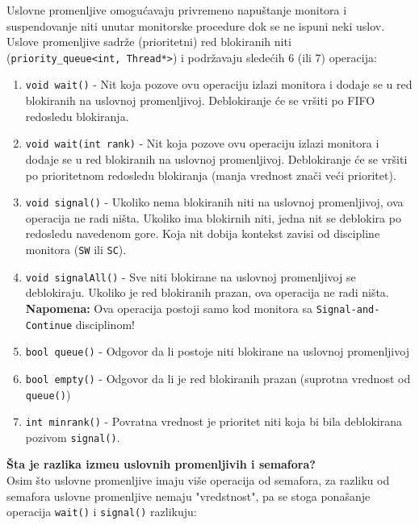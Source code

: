 Uslovne promenljive omogu\'{c}avaju privremeno napu\v{s}tanje monitora i suspendovanje niti unutar monitorske procedure dok se ne ispuni neki uslov. Uslove promenljive sadr\v{z}e (prioritetni) red blokiranih niti \\(\texttt{priority\_queue<int, Thread*>}) i podr\v{z}avaju slede\'{c}ih 6 (ili 7) operacija:
\begin{enumerate}
    \item \texttt{void wait()} - Nit koja pozove ovu operaciju izlazi monitora i dodaje se u red blokiranih na uslovnoj promenljivoj. Deblokiranje \'{c}e se vr\v{s}iti po FIFO redosledu blokiranja. 
    \item \texttt{void wait(int rank)} - Nit koja pozove ovu operaciju izlazi monitora i dodaje se u red blokiranih na uslovnoj promenljivoj. Deblokiranje \'{c}e se vr\v{s}iti po prioritetnom redosledu blokiranja (manja vrednost zna\v{c}i ve\'{c}i prioritet).
    \item \texttt{void signal()} - Ukoliko nema blokiranih niti na uslovnoj promenljivoj, ova operacija ne radi ni\v{s}ta. Ukoliko ima blokirnih niti, jedna nit se deblokira po redosledu navedenom gore. Koja nit dobija kontekst zavisi od discipline monitora (\texttt{SW} ili \texttt{SC}).
    \item \texttt{void signalAll()} - Sve niti blokirane na uslovnoj promenljivoj se deblokiraju. Ukoliko je red blokiranih prazan, ova operacija ne radi ni\v{s}ta. \textbf{Napomena:} Ova operacija postoji samo kod monitora sa \texttt{Signal-and-Continue} disciplinom!
    \item \texttt{bool queue()} - Odgovor da li postoje niti blokirane na uslovnoj promenljivoj
    \item \texttt{bool empty()} - Odgovor da li je red blokiranih prazan (suprotna vrednost od \texttt{queue()})
    \item \texttt{int minrank()} - Povratna vrednost je prioritet niti koja bi bila deblokirana pozivom \texttt{signal()}.
\end{enumerate}
\textbf{\v{S}ta je razlika izme\dj{}u uslovnih promenljivih i semafora?}\\
 Osim  \v{s}to uslovne promenljive imaju vi\v{s}e operacija od semafora, za razliku od semafora uslovne promenljive nemaju "vredstnost", pa se stoga pona\v{s}anje operacija \texttt{wait()} i \texttt{signal()}  razlikuju:
